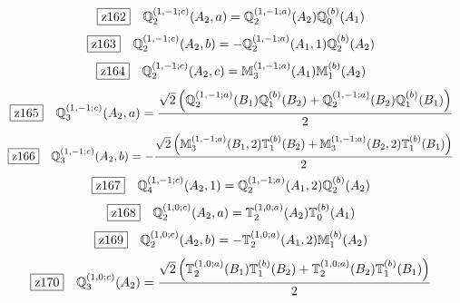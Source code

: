 \documentclass[fleqn,10pt,landscape]{jsarticle}
\begin{document}
\begin{dmath*}
\hspace*{3mm}\fbox{z162}\quad \mathbb{Q}_{2}^{(1,-1;c)}(A_{2},a)=\mathbb{Q}_{2}^{(1,-1;a)}(A_{2}) \mathbb{Q}_{0}^{(b)}(A_{1})
\end{dmath*}
\begin{dmath*}
\hspace*{3mm}\fbox{z163}\quad \mathbb{Q}_{2}^{(1,-1;c)}(A_{2},b)=- \mathbb{Q}_{2}^{(1,-1;a)}(A_{1},1) \mathbb{Q}_{2}^{(b)}(A_{2})
\end{dmath*}
\begin{dmath*}
\hspace*{3mm}\fbox{z164}\quad \mathbb{Q}_{2}^{(1,-1;c)}(A_{2},c)=\mathbb{M}_{3}^{(1,-1;a)}(A_{1}) \mathbb{M}_{1}^{(b)}(A_{2})
\end{dmath*}
\begin{dmath*}
\hspace*{3mm}\fbox{z165}\quad \mathbb{Q}_{3}^{(1,-1;c)}(A_{2},a)=\frac{\sqrt{2} \left(\mathbb{Q}_{2}^{(1,-1;a)}(B_{1}) \mathbb{Q}_{1}^{(b)}(B_{2}) + \mathbb{Q}_{2}^{(1,-1;a)}(B_{2}) \mathbb{Q}_{1}^{(b)}(B_{1})\right)}{2}
\end{dmath*}
\begin{dmath*}
\hspace*{3mm}\fbox{z166}\quad \mathbb{Q}_{3}^{(1,-1;c)}(A_{2},b)=- \frac{\sqrt{2} \left(\mathbb{M}_{3}^{(1,-1;a)}(B_{1},2) \mathbb{T}_{1}^{(b)}(B_{2}) + \mathbb{M}_{3}^{(1,-1;a)}(B_{2},2) \mathbb{T}_{1}^{(b)}(B_{1})\right)}{2}
\end{dmath*}
\begin{dmath*}
\hspace*{3mm}\fbox{z167}\quad \mathbb{Q}_{4}^{(1,-1;c)}(A_{2},1)=\mathbb{Q}_{2}^{(1,-1;a)}(A_{1},2) \mathbb{Q}_{2}^{(b)}(A_{2})
\end{dmath*}
\begin{dmath*}
\hspace*{3mm}\fbox{z168}\quad \mathbb{Q}_{2}^{(1,0;c)}(A_{2},a)=\mathbb{T}_{2}^{(1,0;a)}(A_{2}) \mathbb{T}_{0}^{(b)}(A_{1})
\end{dmath*}
\begin{dmath*}
\hspace*{3mm}\fbox{z169}\quad \mathbb{Q}_{2}^{(1,0;c)}(A_{2},b)=- \mathbb{T}_{2}^{(1,0;a)}(A_{1},2) \mathbb{M}_{1}^{(b)}(A_{2})
\end{dmath*}
\begin{dmath*}
\hspace*{3mm}\fbox{z170}\quad \mathbb{Q}_{3}^{(1,0;c)}(A_{2})=\frac{\sqrt{2} \left(\mathbb{T}_{2}^{(1,0;a)}(B_{1}) \mathbb{T}_{1}^{(b)}(B_{2}) + \mathbb{T}_{2}^{(1,0;a)}(B_{2}) \mathbb{T}_{1}^{(b)}(B_{1})\right)}{2}
\end{dmath*}
\end{document}
